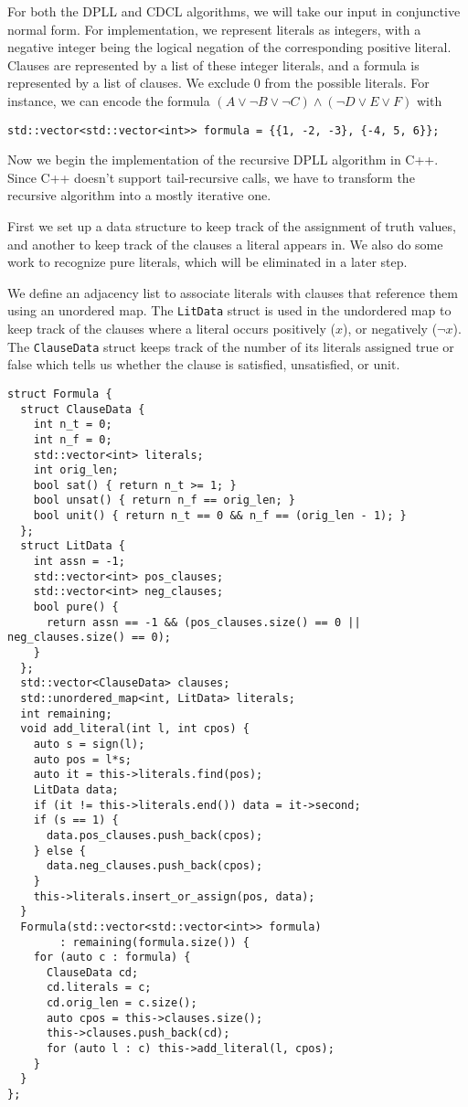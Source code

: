 \documentclass[10pt,AMS Euler]{article}
\begin{document}
For both the DPLL and CDCL algorithms, we will take our input in conjunctive normal form. For implementation,
we represent literals as integers, with a negative integer being the logical negation of the corresponding
positive literal. Clauses are represented by a list of these integer literals, and a formula is represented
by a list of clauses. We exclude 0 from the possible literals.
For instance, we can encode the formula \((A \lor \neg B \lor \neg C) \land (\neg D \lor E \lor F)\) with
\begin{verbatim}
std::vector<std::vector<int>> formula = {{1, -2, -3}, {-4, 5, 6}};
\end{verbatim}

Now we begin the implementation of the recursive DPLL algorithm in C++. Since C++ doesn't
support tail-recursive calls, we have to transform the recursive algorithm into a mostly
iterative one.

First we set up a data structure to keep track of the assignment of truth values, and another to keep
track of the clauses a literal appears in. We also do some work to recognize pure literals, which
will be eliminated in a later step.

We define an adjacency list to associate literals with clauses that reference them using
an unordered map. The \texttt{LitData} struct is used in the undordered map to keep track of the
clauses where a literal occurs positively (\(x\)), or negatively (\(\neg x\)). The \texttt{ClauseData} struct
keeps track of the number of its literals assigned true or false which tells us whether the clause
is satisfied, unsatisfied, or unit.
\begin{verbatim}
struct Formula {
  struct ClauseData {
    int n_t = 0;
    int n_f = 0;
    std::vector<int> literals;
    int orig_len;
    bool sat() { return n_t >= 1; }
    bool unsat() { return n_f == orig_len; }
    bool unit() { return n_t == 0 && n_f == (orig_len - 1); }
  };
  struct LitData {
    int assn = -1;
    std::vector<int> pos_clauses;
    std::vector<int> neg_clauses;
    bool pure() {
      return assn == -1 && (pos_clauses.size() == 0 || neg_clauses.size() == 0);
    }
  };
  std::vector<ClauseData> clauses;
  std::unordered_map<int, LitData> literals;
  int remaining;
  void add_literal(int l, int cpos) {
    auto s = sign(l);
    auto pos = l*s;
    auto it = this->literals.find(pos);
    LitData data;
    if (it != this->literals.end()) data = it->second;
    if (s == 1) {
      data.pos_clauses.push_back(cpos);
    } else {
      data.neg_clauses.push_back(cpos);
    }
    this->literals.insert_or_assign(pos, data);
  }
  Formula(std::vector<std::vector<int>> formula)
        : remaining(formula.size()) {
    for (auto c : formula) {
      ClauseData cd;
      cd.literals = c;
      cd.orig_len = c.size();
      auto cpos = this->clauses.size();
      this->clauses.push_back(cd);
      for (auto l : c) this->add_literal(l, cpos);
    }
  }
};
\end{verbatim}
\end{document}
